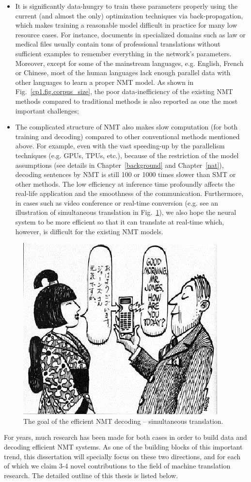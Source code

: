 \begin{itemize}
	\item  It is significantly data-hungry to train these parameters properly using the current (and almost the only) optimization techniques via back-propagation, which makes training a reasonable model difficult in practice for many low resource cases. 
For instance, documents in specialized domains such as law or medical files usually contain tons of professional translations without sufficient examples to remember everything in the network's parameters. Moreover, except for some of the mainstream languages, e.g. English, French or Chinese, most of the human languages lack enough parallel data with other languages to learn a proper NMT model. As shown in Fig.~\ref{cp1.fig.corpus_size}, the poor data-inefficiency of the existing NMT methods compared to traditional methods is also reported as one the most important challenges; 
\item The complicated structure of NMT also makes slow computation (for both training and decoding) compared to other  conventional methods mentioned above. For example, even with the vast speeding-up by the parallelism techniques (e.g. GPUs, TPUs, etc.), because of the restriction of the model assumptions (see details in Chapter~\ref{background} and Chapter~\ref{nat}), decoding sentences by NMT is still 100 or 1000 times slower than SMT or other methods. The low efficiency at inference time profoundly affects the real-life application and the smoothness of the communication. Furthermore, in cases such as video conference or real-time conversion (e.g. see an illustration of simultaneous translation in Fig.~\ref{cp1.fig.simultaneous}), we also hope the neural system to be more efficient so that it can translate at real-time which, however, is difficult for the existing NMT models. 
\end{itemize}
\begin{figure}[hptb]
\centering
\includegraphics[width=0.6\linewidth]{figs/intro/real_time.jpg}
\caption{\label{cp1.fig.simultaneous}The goal of the efficient NMT decoding -- simultaneous translation.}
\end{figure}
For years, much research has been made for both cases in order to build data and decoding efficient NMT systems. As one of the building blocks of this important trend, this dissertation will specially focus on these two directions, and for each of which we claim 3-4 novel contributions to the field of machine translation research. The detailed outline of this thesis is listed below.

